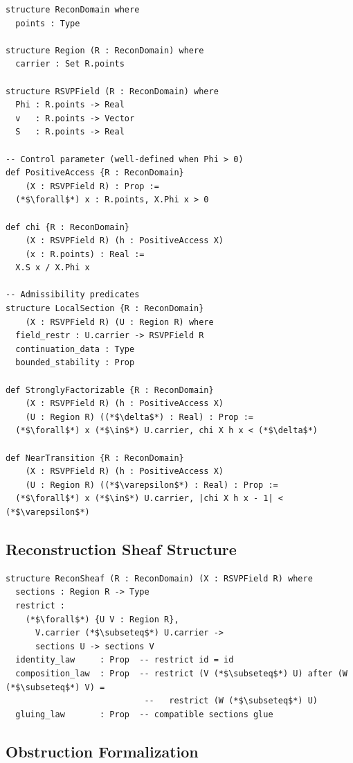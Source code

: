 \documentclass[11pt, a4paper]{article}
\theoremstyle{plain}
\theoremstyle{definition}
\theoremstyle{remark}
\begin{document}
\begin{lstlisting}[caption={Lean-style typed structures for RSVP objects}]
structure ReconDomain where
  points : Type

structure Region (R : ReconDomain) where
  carrier : Set R.points

structure RSVPField (R : ReconDomain) where
  Phi : R.points -> Real
  v   : R.points -> Vector
  S   : R.points -> Real

-- Control parameter (well-defined when Phi > 0)
def PositiveAccess {R : ReconDomain}
    (X : RSVPField R) : Prop :=
  (*$\forall$*) x : R.points, X.Phi x > 0

def chi {R : ReconDomain}
    (X : RSVPField R) (h : PositiveAccess X)
    (x : R.points) : Real :=
  X.S x / X.Phi x

-- Admissibility predicates
structure LocalSection {R : ReconDomain}
    (X : RSVPField R) (U : Region R) where
  field_restr : U.carrier -> RSVPField R
  continuation_data : Type
  bounded_stability : Prop

def StronglyFactorizable {R : ReconDomain}
    (X : RSVPField R) (h : PositiveAccess X)
    (U : Region R) ((*$\delta$*) : Real) : Prop :=
  (*$\forall$*) x (*$\in$*) U.carrier, chi X h x < (*$\delta$*)

def NearTransition {R : ReconDomain}
    (X : RSVPField R) (h : PositiveAccess X)
    (U : Region R) ((*$\varepsilon$*) : Real) : Prop :=
  (*$\forall$*) x (*$\in$*) U.carrier, |chi X h x - 1| < (*$\varepsilon$*)
\end{lstlisting}

\subsection{Reconstruction Sheaf Structure}

\begin{lstlisting}[caption={Lean-style reconstruction sheaf}]
structure ReconSheaf (R : ReconDomain) (X : RSVPField R) where
  sections : Region R -> Type
  restrict :
    (*$\forall$*) {U V : Region R},
      V.carrier (*$\subseteq$*) U.carrier ->
      sections U -> sections V
  identity_law     : Prop  -- restrict id = id
  composition_law  : Prop  -- restrict (V (*$\subseteq$*) U) after (W (*$\subseteq$*) V) =
                            --   restrict (W (*$\subseteq$*) U)
  gluing_law       : Prop  -- compatible sections glue
\end{lstlisting}

\subsection{Obstruction Formalization}
\end{document}
